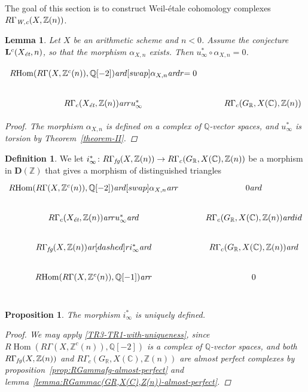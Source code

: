 \documentclass[draft,leqno,12pt]{article}
\theoremstyle{plain}
\newtheorem{lemma}[theorem]{\indent\sc Lemma}
\newtheorem{proposition}[theorem]{\indent\sc Proposition}
\theoremstyle{definition}
\newtheorem{definition}[theorem]{\indent\sc Definition}
\DeclareMathOperator{\Hom}{Hom}
\newcommand{\ZZ}{\mathbb{Z}}
\newcommand{\QQ}{\mathbb{Q}}
\newcommand{\RR}{\mathbb{R}}
\newcommand{\CC}{\mathbb{C}}
\newcommand{\Wc}{\text{\it W,c}}
\newcommand{\et}{\text{\it \'{e}t}}
\newcommand{\fg}{\text{\it fg}}
\newcommand{\ar}{\text{\it ar}}
\newcommand{\RHom}{R\!\Hom}
\begin{document}
The goal of this section is to construct Weil-\'{e}tale cohomology complexes
$R\Gamma_\Wc (X, \ZZ(n))$.

\begin{lemma}
  Let $X$ be an arithmetic scheme and $n < 0$. Assume the conjecture
  $\mathbf{L}^c (X_\et, n)$, so that the morphism $\alpha_{X,n}$ exists.
  Then $u_\infty^* \circ \alpha_{X,n} = 0$.

  \[ \begin{tikzcd}
    \RHom (R\Gamma (X, \ZZ^c (n)), \QQ [-2]) \ar{d}[swap]{\alpha_{X,n}}\ar{dr}{= 0} \\
      R\Gamma_c (X_\et, \ZZ (n)) \ar{r}{u_\infty^*} & R\Gamma_c (G_\RR, X (\CC), \ZZ (n))
    \end{tikzcd} \]

  \begin{proof}
    The morphism $\alpha_{X,n}$ is defined on a complex of $\QQ$-vector spaces,
    and $u_\infty^*$ is torsion by Theorem~\ref{theorem-II}.
  \end{proof}
\end{lemma}

\begin{definition}
  \label{dfn:i-infty}
  We let
  $i_\infty^*\colon R\Gamma_\fg (X, \ZZ (n)) \to R\Gamma_c (G_\RR, X (\CC), \ZZ (n))$
  be a morphism in $\mathbf{D} (\ZZ)$ that gives a morphism of distinguished
  triangles
  \begin{equation}
    \label{eqn:triangle-defining-i-infty}
    \begin{tikzcd}
      \RHom (R\Gamma (X, \ZZ^c (n)), \QQ [-2]) \ar{d}[swap]{\alpha_{X,n}}\ar{r} & 0\ar{d} \\
      R\Gamma_c (X_\et, \ZZ (n)) \ar{r}{u_\infty^*}\ar{d} &  R\Gamma_c (G_\RR, X (\CC), \ZZ (n)) \ar{d}{id} \\
      R\Gamma_\fg (X, \ZZ (n)) \ar[dashed]{r}{i_\infty^*}\ar{d} & R\Gamma_c (G_\RR, X (\CC), \ZZ (n)) \ar{d} \\
      \RHom (R\Gamma (X, \ZZ^c (n)), \QQ [-1])\ar{r} & 0 \\
    \end{tikzcd}
  \end{equation}
\end{definition}

\begin{proposition}
  \label{prop:uniqueness-of-i-infty}
  The morphism $i_\infty^*$ is uniquely defined.

  \begin{proof}
    We may apply \ref{TR3-TR1-with-uniqueness}, since
    $\RHom (R\Gamma (X, \ZZ^c (n)), \QQ [-2])$ is a complex of $\QQ$-vector
    spaces, and both
    $R\Gamma_\fg (X, \ZZ (n))$ and
    $R\Gamma_c (G_\RR, X (\CC), \ZZ (n))$
    are almost perfect complexes by
    proposition~\ref{prop:RGammafg-almost-perfect} and
    lemma~\ref{lemma:RGammac(GR,X(C),Z(n))-almost-perfect}.
  \end{proof}
\end{proposition}
\end{document}
